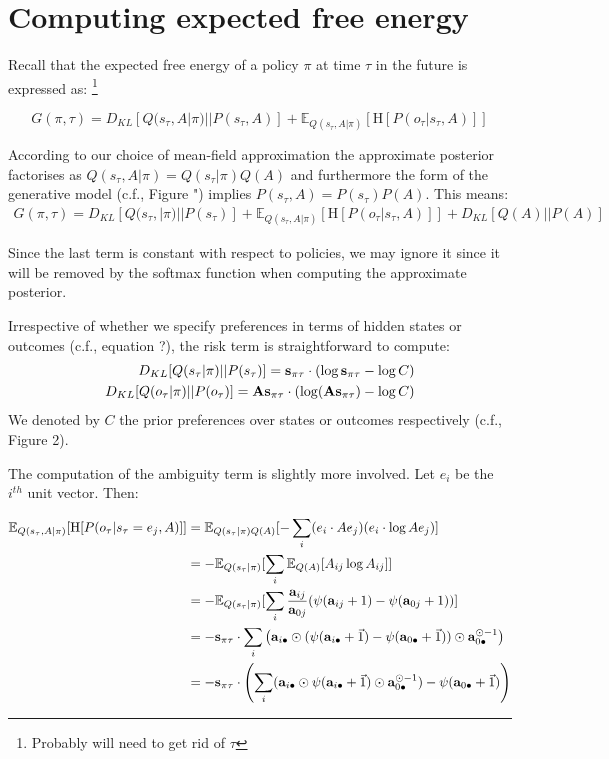 \documentclass{article}
\theoremstyle{plain}
\theoremstyle{definition}
\theoremstyle{proposition}
\theoremstyle{corollary}
\theoremstyle{lemma}
\theoremstyle{remark}
\theoremstyle{example}
\begin{document}
\section{Computing expected free energy}
Recall that the expected free energy of a policy $\pi$ at time $\tau$ in the future is expressed as: \footnote{Probably will need to get rid of $\tau$}

$$G(\pi, \tau )= D_{KL}[Q(s_\tau, A|\pi)||P(s_\tau,A)]+\mathbb E_{Q(s_\tau, A|\pi)}[\text {H}[ P(o_\tau|s_\tau,A)]]$$

According to our choice of mean-field approximation the approximate posterior factorises as $Q(s_\tau ,A|\pi)= Q(s_\tau |\pi)Q(A)$ and furthermore the form of the generative model (c.f., Figure ") implies $P(s_\tau ,A)=P(s_\tau)P(A)$. This means:
\begin{multline}
    G(\pi, \tau )=  D_{KL}[Q(s_\tau, |\pi)||P(s_\tau)]+\mathbb E_{Q(s_\tau, A|\pi)}[\text {H}[ P(o_\tau|s_\tau,A)]]+D_{KL}[Q(A)||P(A)]
\end{multline}

Since the last term is constant with respect to policies, we may ignore it since it will be removed by the softmax function when computing the approximate posterior.

Irrespective of whether we specify preferences in terms of hidden states or outcomes (c.f., equation ?), the risk term is straightforward to compute:
\begin{align}
   D_{KL}[Q(s_\tau |\pi)||P(s_\tau)]= \bold s_{\pi \tau} \cdot (\log \bold s_{\pi \tau}-\log C) \\
   D_{KL}[Q(o_\tau |\pi)||P(o_\tau)]= \bold A \bold s_{\pi \tau} \cdot (\log (\bold A \bold s_{\pi \tau})-\log C)
\end{align}
We denoted by $C$ the prior preferences over states or outcomes respectively (c.f., Figure 2).

The computation of the ambiguity term is slightly more involved. Let $e_i$ be the $i^{th}$ unit vector. Then: 

\begin{equation}
    \begin{split}
        \mathbb E_{Q(s_\tau, A|\pi)}[\text {H}[ P(o_\tau|s_\tau =e_j,A)]] &=
        \mathbb E_{Q(s_\tau|\pi)Q(A)}[- \sum_i (e_i \cdot A e_j)(e_i \cdot \log A e_j)] \\
         &= - \mathbb E_{Q(s_\tau|\pi)}[\sum_i \mathbb E_{Q(A)}[ A_{ij} \log A_{ij}]] \\
        &= - \mathbb E_{Q(s_\tau|\pi)}[ \sum_i \frac{\bold a_{ij}}{ \bold a_{0j}}(\psi(\bold a_{ij}+1)-\psi(\bold a_{0j}+1))] \\
        &= - \bold s_{\pi \tau } \cdot \sum_i \left (\bold a_{i\bullet} \odot  (\psi(\bold a_{i\bullet }+ \vec 1)-\psi(\bold a_{0\bullet }+ \vec 1))\odot \bold a_{0\bullet}^{\odot -1} \right ) \\
        &= - \bold s_{\pi \tau } \cdot  \left (\sum_i (\bold a_{i\bullet} \odot  \psi(\bold a_{i\bullet }+ \vec 1)\odot \bold a_{0\bullet}^{\odot -1})-\psi(\bold a_{0\bullet }+\vec 1) \right )
    \end{split}
\end{equation}
\end{document}
